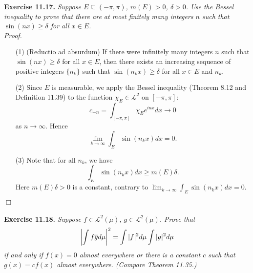 \documentclass{article}
\begin{document}



\textbf{Exercise 11.17.}
\emph{Suppose $E \subseteq (-\pi,\pi)$, $m(E) > 0$, $\delta > 0$.
Use the Bessel inequality to prove that there are at most finitely many integers $n$
such that $\sin(nx) \geq \delta$ for all $x \in E$.} \\

\emph{Proof.}
\begin{enumerate}
\item[(1)]
  (Reductio ad absurdum)
  If there were infinitely many integers $n$
  such that $\sin(nx) \geq \delta$ for all $x \in E$,
  then there exists an increasing sequence of positive integers $\{n_k\}$
  such that $\sin(n_k x) \geq \delta$ for all $x \in E$ and $n_k$.

\item[(2)]
  Since $E$ is measurable,
  we apply the Bessel inequality (Theorem 8.12 and Definition 11.39) to
  the function $\chi_{E} \in \mathscr{L}^2$ on $[-\pi,\pi]$:
  \[
    c_{-n}
    = \int_{[-\pi,\pi]} \chi_{E} e^{inx} dx
    \to 0
  \]
  as $n \to \infty$.
  Hence
  \[
    \lim_{k \to \infty} \int_{E} \sin(n_k x) dx
    = 0.
  \]

\item[(3)]
  Note that for all $n_k$, we have
  \[
    \int_{E} \sin(n_k x) dx
    \geq m(E) \delta.
  \]
  Here $m(E) \delta > 0$ is a constant, contrary to
  $\lim_{k \to \infty} \int_{E} \sin(n_k x) dx = 0$.
\end{enumerate}
$\Box$ \\\\






\textbf{Exercise 11.18.}
\emph{Suppose $f \in \mathscr{L}^2(\mu)$, $g \in \mathscr{L}^2(\mu)$.
Prove that
\[
  \abs{ \int f\overline{g} d\mu }^2 = \int |f|^2 d\mu \int |g|^2 d\mu
\]
if and only if $f(x) = 0$ almost everywhere or there is a constant $c$ such that
$g(x) = cf(x)$ almost everywhere.
(Compare Theorem 11.35.)} \\
\end{document}
